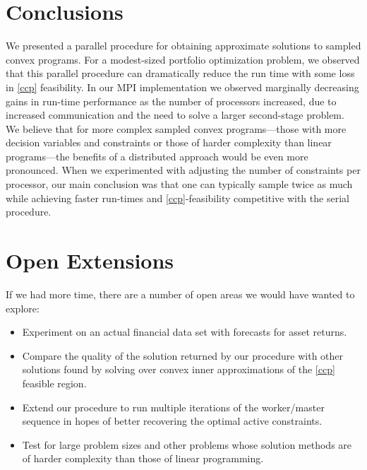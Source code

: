 \documentclass[12pt]{article}
\begin{document}
\section*{Conclusions}
We presented a parallel procedure for obtaining approximate solutions to sampled convex programs.
For a modest-sized portfolio optimization problem, we observed that this parallel procedure can dramatically reduce the run time with some loss in \ref{ccp} feasibility.
In our MPI implementation we observed marginally decreasing gains in run-time performance as the number of processors increased, due to increased communication and the need to solve a larger second-stage problem.
We believe that for more complex sampled convex programs---those with more decision variables and constraints or those of harder complexity than linear programs---the benefits of a distributed approach would be even more pronounced.
When we experimented with adjusting the number of constraints per processor, our main conclusion was that one can typically sample twice as much while achieving faster run-times and \ref{ccp}-feasibility competitive with the serial procedure.


\section*{Open Extensions}
If we had more time, there are a number of open areas we would have wanted to explore:
\begin{itemize}
\item Experiment on an actual financial data set with forecasts for asset returns.
\item Compare the quality of the solution returned by our procedure with other solutions found by solving over convex inner approximations of the \ref{ccp} feasible region.
\item Extend our procedure to run multiple iterations of the worker/master sequence in hopes of better recovering the optimal active constraints.
\item Test for large problem sizes and other problems whose solution methods are of harder complexity than those of linear programming.
\end{itemize}
\end{document}
